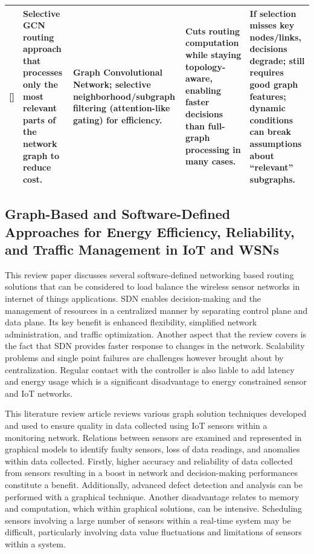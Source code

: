 \documentclass[a4paper,fleqn]{cas-dc}
\numberwithin{equation}{section}
\begin{document}
\begin{table}[t]
\begin{tabular}{|p{}|p{}|p{}|p{}|p{}|}
\textbf{[\cite{Karthikeyan2025}]} &
Selective GCN routing approach that processes only the most relevant parts of the network graph to reduce cost. &
Graph Convolutional Network; selective neighborhood/subgraph filtering (attention-like gating) for efficiency. &
Cuts routing computation while staying topology-aware, enabling faster decisions than full-graph processing in many cases. &
If selection misses key nodes/links, decisions degrade; still requires good graph features; dynamic conditions can break assumptions about “relevant” subgraphs. \\
\hline

\hline
\end{tabular}
\end{table}
\subsection{Graph-Based and Software-Defined Approaches for Energy Efficiency, Reliability, and Traffic Management in IoT and WSNs}
This review paper \cite{Isyaku2024} discusses several software-defined networking based routing solutions that can be considered to load balance the wireless sensor networks in internet of things applications. SDN enables decision-making and the management of resources in a centralized manner by separating control plane and data plane. Its key benefit is enhanced flexibility, simplified network administration, and traffic optimization. Another aspect that the review covers is the fact that SDN provides faster response to changes in the network. Scalability problems and single point failures are challenges however brought about by centralization. Regular contact with the controller is also liable to add latency and energy usage which is a significant disadvantage to energy constrained sensor and IoT networks.

This literature review article \cite{Ferrer-Cid2025} reviews various graph solution techniques developed and used to ensure quality in data collected using IoT sensors within a monitoring network. Relations between sensors are examined and represented in graphical models to identify faulty sensors, loss of data readings, and anomalies within data collected. Firstly, higher accuracy and reliability of data collected from sensors resulting in a boost in network and decision-making performances constitute a benefit. Additionally, advanced defect detection and analysis can be performed with a graphical technique. Another disadvantage relates to memory and computation, which within graphical solutions, can be intensive. Scheduling sensors involving a large number of sensors within a real-time system may be difficult, particularly involving data value fluctuations and limitations of sensors within a system.
\end{document}
